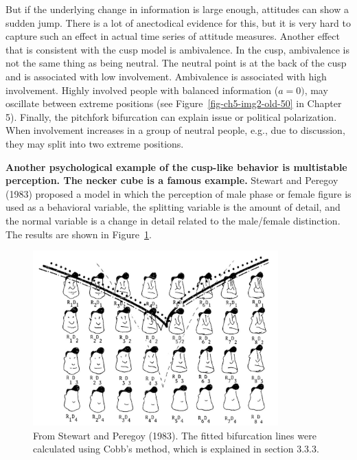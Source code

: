 \documentclass[
  letterpaper,
]{scrbook}
\begin{document}
But if the underlying change in information is large enough, attitudes
can show a sudden jump. There is a lot of anectodical evidence for this,
but it is very hard to capture such an effect in actual time series of
attitude measures. Another effect that is consistent with the cusp model
is ambivalence. In the cusp, ambivalence is not the same thing as being
neutral. The neutral point is at the back of the cusp and is associated
with low involvement. Ambivalence is associated with high involvement.
Highly involved people with balanced information (\(a = 0)\), may
oscillate between extreme positions (see
Figure~\ref{fig-ch5-img2-old-50} in Chapter 5). Finally, the pitchfork
bifurcation can explain issue or political polarization. When
involvement increases in a group of neutral people, e.g., due to
discussion, they may split into two extreme positions.

\textbf{Another psychological example of the cusp-like behavior is
multistable perception. The necker cube is a famous example.} Stewart
and Peregoy (1983) proposed a model in which the perception of male
phase or female figure is used as a behavioral variable, the splitting
variable is the amount of detail, and the normal variable is a change in
detail related to the male/female distinction. The results are shown in
Figure~\ref{fig-ch3-img14-old-26}.

\begin{figure}

{\centering \includegraphics[width=3.71844in,height=2.65691in]{media/ch3/image14.jpg}

}

\caption{\label{fig-ch3-img14-old-26}From Stewart and Peregoy (1983).
The fitted bifurcation lines were calculated using Cobb's method, which
is explained in section 3.3.3.}

\end{figure}
\end{document}
